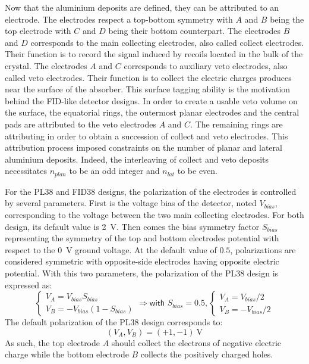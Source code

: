 Now that the aluminium deposits are defined, they can be attributed to an electrode. The electrodes respect a top-bottom symmetry with $A$ and $B$ being the top electrode with $C$ and $D$ being their bottom counterpart. The electrodes $B$ and $D$ corresponds to the main collecting electrodes, also called collect electrodes. Their function is to record the signal induced by recoils located in the bulk of the crystal. The electrodes $A$ and $C$ corresponds to auxiliary veto electrodes, also called veto electrodes. Their function is to collect the electric charges produces near the surface of the absorber. This surface tagging ability is the motivation behind the FID-like detector designs. In order to create a usable veto volume on the surface, the equatorial rings, the outermost planar electrodes and the central pads are attributed to the veto electrodes $A$ and $C$. The remaining rings are attributing in order to obtain a succession of collect and veto electrodes. This attribution process imposed constraints on the number of planar and lateral aluminium deposits. Indeed, the interleaving of collect and veto deposits necessitates $n_{plan}$ to be an odd integer and $n_{lat}$ to be even.

For the PL38 and FID38 designs, the polarization of the electrodes is controlled by several parameters. First is the voltage bias of the detector, noted $V_{bias}$, corresponding to the voltage between the two main collecting electrodes. For both design, its default value is \SI{2}{\volt}. Then comes the bias symmetry factor $S_{bias}$ representing the symmetry of the top and bottom electrodes potential with respect to the \SI{0}{\volt} ground voltage. At the default value of $0.5$, polarizations are considered symmetric with opposite-side electrodes having opposite electric potential.
With this two parameters, the polarization of the PL38 design is expressed as:
\begin{equation}
\label{eq:pl38-polarization}
\begin{cases}
\displaystyle
V_A = V_{bias} S_{bias}
\\
\displaystyle
V_B = - V_{bias} (1 - S_{bias})
\end{cases}
\Rightarrow
\textsf{with } S_{bias} = 0.5,
\begin{cases}
\displaystyle
V_A = V_{bias} / 2
\\
\displaystyle
V_B = - V_{bias} / 2 
\end{cases}
\end{equation}
The default polarization of the PL38 design corresponds to:
\begin{equation}
\left( V_A, V_B \right) = (+1, -1) \ \si{\volt}
\end{equation}
As such, the top electrode $A$ should collect the electrons of negative electric charge while the bottom electrode $B$ collects the positively charged holes.


